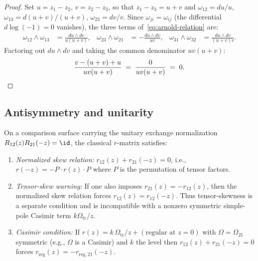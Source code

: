 \begin{proof}
Set $u = z_1 - z_2$, $v = z_2 - z_3$, so that
$z_1 - z_3 = u + v$ and $\omega_{12} = du/u$,
$\omega_{13} = d(u+v)/(u+v)$, $\omega_{23} = dv/v$.
Since $\omega_{ji} = \omega_{ij}$ (the differential
$d\log(-1) = 0$ vanishes), the three terms of~\eqref{eq:arnold-relation} are:
\begin{align*}
\omega_{12} \wedge \omega_{13}
&= \frac{du \wedge dv}{u(u+v)}, &
\omega_{23} \wedge \omega_{21}
&= -\frac{du \wedge dv}{uv}, &
\omega_{31} \wedge \omega_{32}
&= \frac{du \wedge dv}{(u+v)v}.
\end{align*}
Factoring out $du \wedge dv$ and taking the common denominator
$uv(u+v)$:
\[
\frac{v - (u+v) + u}{uv(u+v)}
\;=\;
\frac{0}{uv(u+v)}
\;=\; 0.
\qedhere
\]
\end{proof}

\subsection{Antisymmetry and unitarity}

\begin{proposition}
On a comparison surface carrying the unitary exchange normalization
\(R_{12}(z)R_{21}(-z)=\id\), the classical $r$-matrix satisfies:
\begin{enumerate}[label=\textup{(\roman*)}]
\item \emph{Normalized skew relation:}
$r_{12}(z) + r_{21}(-z) = 0$, i.e., $r(-z) = -P \cdot r(z)
\cdot P$ where $P$ is the permutation of tensor factors.
\item \emph{Tensor-skew warning:}
If one also imposes \(r_{21}(z)=-r_{12}(z)\), then the normalized
skew relation forces \(r_{12}(z)=r_{12}(-z)\).  Thus tensor-skewness is
a separate condition and is incompatible with a nonzero symmetric
simple-pole Casimir term \(k\Omega_{\mathrm{tr}}/z\).
\item \emph{Casimir condition:}
If $r(z) = k\,\Omega_{\mathrm{tr}}/z + (\text{regular at } z = 0)$ with
$\Omega = \Omega_{21}$ symmetric (e.g., $\Omega$ is a Casimir)
and $k$ the level then $r_{12}(z) + r_{21}(-z) = 0$ forces
$r_{\mathrm{reg}}(z) = -r_{\mathrm{reg},21}(-z)$.
\end{enumerate}
\end{proposition}

